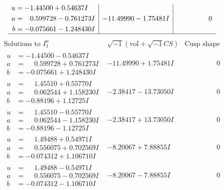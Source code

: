 \documentclass[1p]{elsarticle_modified}
\theoremstyle{definition}
\newcommand{\I}{\sqrt{-1}}
\begin{document}
$$\begin{array}{c|c|c}
\begin{aligned}
u &= -1.44500 + 0.54637 I \\
a &= \phantom{-}0.599728 - 0.761273 I \\
b &= -0.075661 - 1.248430 I\end{aligned}
 & -11.49990 - 1.75481 I & \phantom{-0.000000 } 0\\
 \hline 
 \end{array}$$\newpage$$\begin{array}{c|c|c}  
\text{Solutions to }I^u_{1}& \I (\text{vol} + \sqrt{-1}CS) & \text{Cusp shape}\\
 \hline 
\begin{aligned}
u &= -1.44500 - 0.54637 I \\
a &= \phantom{-}0.599728 + 0.761273 I \\
b &= -0.075661 + 1.248430 I\end{aligned}
 & -11.49990 + 1.75481 I & \phantom{-0.000000 } 0 \\ \hline\begin{aligned}
u &= \phantom{-}1.45510 + 0.55770 I \\
a &= \phantom{-}0.062544 + 1.158230 I \\
b &= -0.88196 + 1.12725 I\end{aligned}
 & -2.38417 - 13.73050 I & \phantom{-0.000000 } 0 \\ \hline\begin{aligned}
u &= \phantom{-}1.45510 - 0.55770 I \\
a &= \phantom{-}0.062544 - 1.158230 I \\
b &= -0.88196 - 1.12725 I\end{aligned}
 & -2.38417 + 13.73050 I & \phantom{-0.000000 } 0 \\ \hline\begin{aligned}
u &= \phantom{-}1.49488 + 0.54971 I \\
a &= \phantom{-}0.556075 + 0.702569 I \\
b &= -0.074312 + 1.106710 I\end{aligned}
 & -8.20067 + 7.88855 I & \phantom{-0.000000 } 0 \\ \hline\begin{aligned}
u &= \phantom{-}1.49488 - 0.54971 I \\
a &= \phantom{-}0.556075 - 0.702569 I \\
b &= -0.074312 - 1.106710 I\end{aligned}
 & -8.20067 - 7.88855 I & \phantom{-0.000000 } 0 \\ \hline\begin{aligned}

\end{aligned}
\end{array}$$
\end{document}
